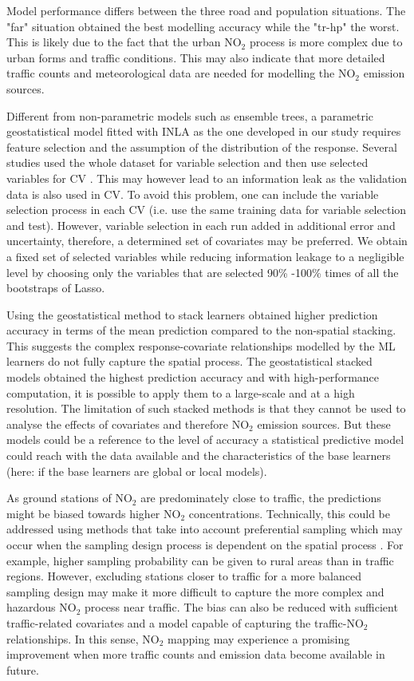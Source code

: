 \documentclass{article}
\begin{document}
Model performance differs between the three road and population situations. The "far" situation obtained the best modelling accuracy while the "tr-hp" the worst. This is likely due to the fact that the urban NO$_2$ process is more complex due to urban forms and traffic conditions. This may also indicate that more detailed traffic counts and meteorological data are needed for modelling the NO$_2$ emission sources.  

Different from non-parametric models such as ensemble trees, a parametric geostatistical model fitted with INLA as the one developed in our study requires feature selection and the assumption of the distribution of the response. Several studies used the whole dataset for variable selection and then use selected variables for CV \citep{lu2020land,larkin2017global}. This may however lead to an information leak as the validation data is also used in CV. To avoid this problem, one can include the variable selection process in each CV (i.e. use the same training data for variable selection and test). However, variable selection in each run added in additional error and uncertainty, therefore, a determined set of covariates may be preferred. We obtain a fixed set of selected variables while reducing information leakage to a negligible level by choosing only the variables that are selected 90\% -100\% times of all the bootstraps of Lasso.

Using the geostatistical method to stack learners obtained higher prediction accuracy in terms of the mean prediction compared to the non-spatial stacking. This suggests the complex response-covariate relationships modelled by the ML learners do not fully capture the spatial process. The geostatistical stacked models obtained the highest prediction accuracy and with high-performance computation, it is possible to apply them to a large-scale and at a high resolution. The limitation of such stacked methods is that they cannot be used to analyse the effects of covariates and therefore NO$_2$ emission sources. But these models could be a reference to the level of accuracy a statistical predictive model could reach with the data available and the characteristics of the base learners (here: if the base learners are global or local models).

As ground stations of NO$_2$ are predominately close to traffic, the predictions might be biased towards higher NO$_2$ concentrations. Technically, this could be addressed using methods that take into account preferential sampling which may occur when the sampling design process is dependent on the spatial process \citep{diggle2010geostatistical}. For example,  higher sampling probability can be given to rural areas than in traffic regions. However, excluding stations closer to traffic for a more balanced sampling design may make it more difficult to capture the more complex and hazardous NO$_2$ process near traffic. The bias can also be reduced with sufficient traffic-related covariates and a model capable of capturing the traffic-NO$_2$ relationships. In this sense, NO$_2$ mapping may experience a promising improvement when more traffic counts and emission data become available in future.  
\end{document}
